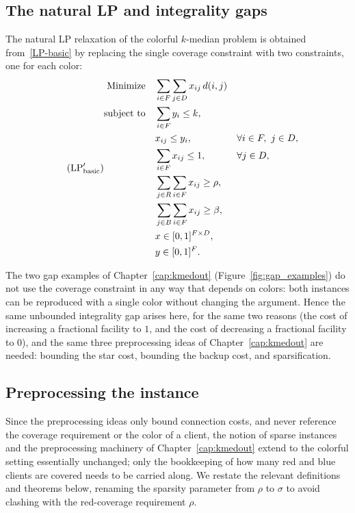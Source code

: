 \subsection{The natural LP and integrality gaps}

The natural LP relaxation of the colorful $k$-median problem is obtained from~\ref{LP-basic} by replacing the single coverage constraint with two constraints, one for each color:
\begin{equation}\tag{$\text{LP}_{\text{basic}}'$} \label{LP-basic-col}
\begin{aligned}
\text{Minimize} \quad &\sum_{i \in F} \sum_{j \in D} x_{ij} \,d(i,j) \\
\text{subject to} \quad &\sum_{i \in F} y_i \le k, \\
&x_{ij} \le y_i, && \forall i \in F, \ j \in D,\\
&\sum_{i \in F} x_{ij} \le 1, && \forall j \in D,\\
&\sum_{j \in R} \sum_{i \in F} x_{ij} \ge \rho, \\
&\sum_{j \in B} \sum_{i \in F} x_{ij} \ge \beta, \\
&x \in[0,1]^{F\times D}, \\
&y \in [0,1]^F.
\end{aligned}
\end{equation}

The two gap examples of Chapter~\ref{cap:kmedout} (Figure~\ref{fig:gap_examples}) do not use the coverage constraint in any way that depends on colors: both instances can be reproduced with a single color without changing the argument. Hence the same unbounded integrality gap arises here, for the same two reasons (the cost of increasing a fractional facility to $1$, and the cost of decreasing a fractional facility to $0$), and the same three preprocessing ideas of Chapter~\ref{cap:kmedout} are needed: bounding the star cost, bounding the backup cost, and sparsification.

\subsection{Preprocessing the instance}

Since the preprocessing ideas only bound connection costs, and never reference the coverage requirement or the color of a client, the notion of sparse instances and the preprocessing machinery of Chapter~\ref{cap:kmedout} extend to the colorful setting essentially unchanged; only the bookkeeping of how many red and blue clients are covered needs to be carried along. We restate the relevant definitions and theorems below, renaming the sparsity parameter from $\rho$ to $\sigma$ to avoid clashing with the red-coverage requirement $\rho$.

